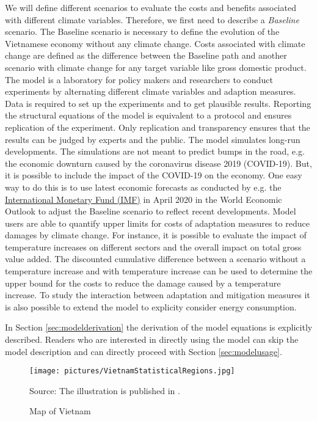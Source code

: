 \documentclass[10pt,a4paper]{article}
\begin{document}
We will define different scenarios to evaluate the costs and benefits associated with different climate variables. Therefore, we first need to describe a \emph{Baseline} scenario. The Baseline scenario is necessary to define the evolution of the Vietnamese economy without any climate change. Costs associated with climate change are defined as the difference between the Baseline path and another scenario with climate change for any target variable like gross domestic product. The model is a laboratory for policy makers and researchers to conduct experiments by alternating different climate variables and adaption measures. Data is required to set up the experiments and to get plausible results. Reporting the structural equations of the model is equivalent to a protocol and ensures replication of the experiment. Only replication and transparency ensures that the results can be judged by experts and the public. The model simulates long-run developments. The simulations are not meant to predict bumps in the road, e.g. the economic downturn caused by the coronavirus disease 2019 (COVID-19). But, it is possible to include the impact of the COVID-19 on the economy. One easy way to do this is to use latest economic forecasts as conducted by e.g. the \href{https://www.imf.org/en/Publications/WEO/Issues/2020/04/14/weo-april-2020}{International Monetary Fund (IMF)} in April 2020 in the World Economic Outlook to adjust the Baseline scenario to reflect recent developments. Model users are able to quantify upper limits for costs of adaptation measures to reduce damages by climate change. For instance, it is possible to evaluate the impact of temperature increases on different sectors and the overall impact on total gross value added. The discounted cumulative difference between a scenario without a temperature increase and with temperature increase can be used to determine the upper bound for the costs to reduce the damage caused by a temperature increase. To study the interaction between adaptation and mitigation measures it is also possible to extend the model to explicity consider energy consumption.

In Section \ref{sec:modelderivation} the derivation of the model equations is explicitly described. Readers who are interested in directly using the model can skip the model description and can directly proceed with Section \ref{sec:modelusage}.

\begin{figure}[h]
\caption{Map of Vietnam}\label{fig:MapVietnam}
\begin{center}
\texttt{[image: pictures/VietnamStatisticalRegions.jpg]}
\end{center}
\footnotesize{Source: The illustration is published in \cite{boateng2012GIS}.}
\end{figure}
\end{document}
